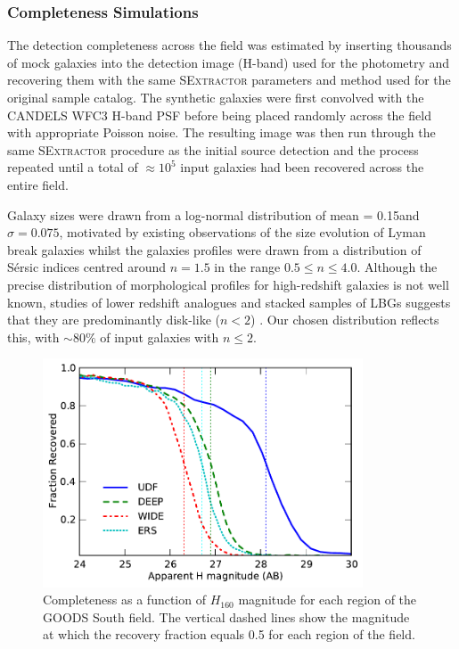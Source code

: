 \subsubsection{Completeness Simulations}\label{sec:completeness}
The detection completeness across the field was estimated by inserting thousands of mock galaxies into the detection image (H-band) used for the photometry and recovering them with the same \textsc{SExtractor} parameters and method used for the original sample catalog. The synthetic galaxies were first convolved with the CANDELS WFC3 H-band PSF before being placed randomly across the field with appropriate Poisson noise. The resulting image was then run through the same \textsc{SExtractor} procedure as the initial source detection and the process repeated until a total of $\approx  10^{5}$ input galaxies had been recovered across the entire field.

Galaxy sizes were drawn from a log-normal distribution of mean = 0.15\arcsec and $\sigma = 0.075$, motivated by existing observations of the size evolution of Lyman break galaxies \citep{2004ApJ...600L.107F,2010ApJ...709L..21O,2011A&A...532A..33G,Huang:2013kb} whilst the galaxies profiles were drawn from a distribution of S\'{e}rsic indices centred around $n=1.5$ in the range $0.5 \le n \le 4.0$. Although the precise distribution of morphological profiles for high-redshift galaxies is not well known, studies of lower redshift analogues and stacked samples of LBGs suggests that they are predominantly disk-like ($n < 2$) \citep{Ravindranath:2006ie,Hathi:2007fh}. Our chosen distribution reflects this, with $\sim 80\%$ of input galaxies with $n \leq 2$.

\begin{figure}
\centering
\includegraphics[width=95mm]{plots/fig3.pdf}

\caption[Completeness as a function of $H_{160}$ magnitude for each region of the GOODS South field.]{Completeness as a function of $H_{160}$ magnitude for each region of the GOODS South field. The vertical dashed lines show the magnitude at which the recovery fraction equals 0.5 for each region of the field.}
\label{fig:completeness}
\end{figure}

